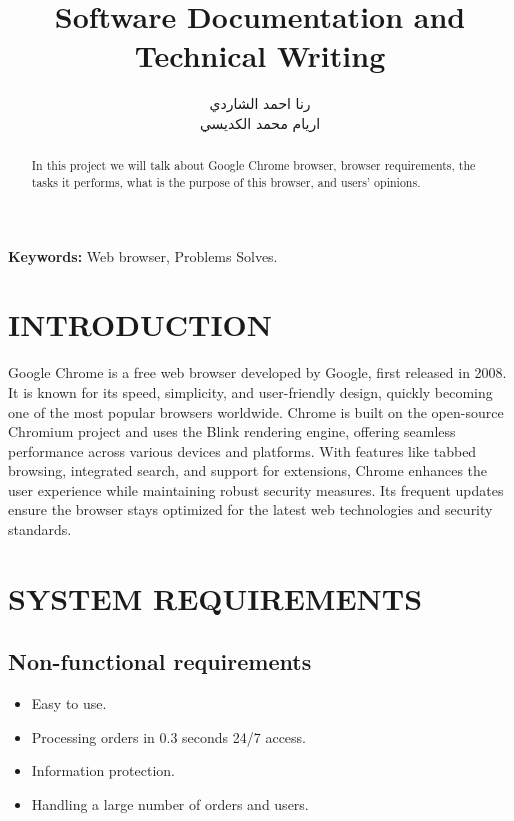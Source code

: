 \documentclass[a4paper,12pt]{article}
\title{Software Documentation and Technical Writing}
\author{رنا احمد الشاردي \quad 44410337 \\ اريام محمد الكديسي \quad 444011065}
\date{}
\begin{document}
\maketitle

\begin{abstract}
In this project we will talk about Google Chrome browser, browser requirements, the tasks it performs, what is the purpose of this browser, and users’ opinions.
\end{abstract}

\textbf{Keywords:} Web browser, Problems Solves.

\newpage

\tableofcontents

\newpage

\section{INTRODUCTION}
Google Chrome is a free web browser developed by Google, first released in 2008. It is known for its speed, simplicity, and user-friendly design, quickly becoming one of the most popular browsers worldwide. Chrome is built on the open-source Chromium project and uses the Blink rendering engine, offering seamless performance across various devices and platforms. With features like tabbed browsing, integrated search, and support for extensions, Chrome enhances the user experience while maintaining robust security measures. Its frequent updates ensure the browser stays optimized for the latest web technologies and security standards.

\section{SYSTEM REQUIREMENTS}

\subsection{Non-functional requirements}
\begin{itemize}
    \item Easy to use.
    \item Processing orders in 0.3 seconds 24/7 access.
    \item Information protection.
    \item Handling a large number of orders and users.
\end{itemize}
\end{document}
